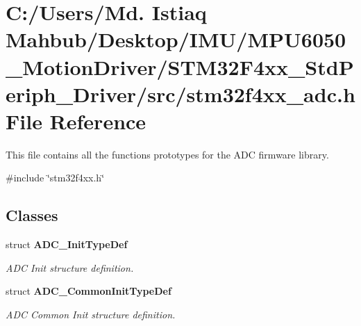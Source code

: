\section{C\+:/\+Users/\+Md. Istiaq Mahbub/\+Desktop/\+I\+M\+U/\+M\+P\+U6050\+\_\+\+Motion\+Driver/\+S\+T\+M32\+F4xx\+\_\+\+Std\+Periph\+\_\+\+Driver/src/stm32f4xx\+\_\+adc.h File Reference}
\label{stm32f4xx__adc_8h}


This file contains all the functions prototypes for the A\+DC firmware library.  


{\ttfamily \#include \char`\"{}stm32f4xx.\+h\char`\"{}}\newline
\subsection*{Classes}
\begin{DoxyCompactItemize}
\item 
struct \textbf{ A\+D\+C\+\_\+\+Init\+Type\+Def}
\begin{DoxyCompactList}\small\item\em A\+DC Init structure definition. \end{DoxyCompactList}\item 
struct \textbf{ A\+D\+C\+\_\+\+Common\+Init\+Type\+Def}
\begin{DoxyCompactList}\small\item\em A\+DC Common Init structure definition. \end{DoxyCompactList}\end{DoxyCompactItemize}
